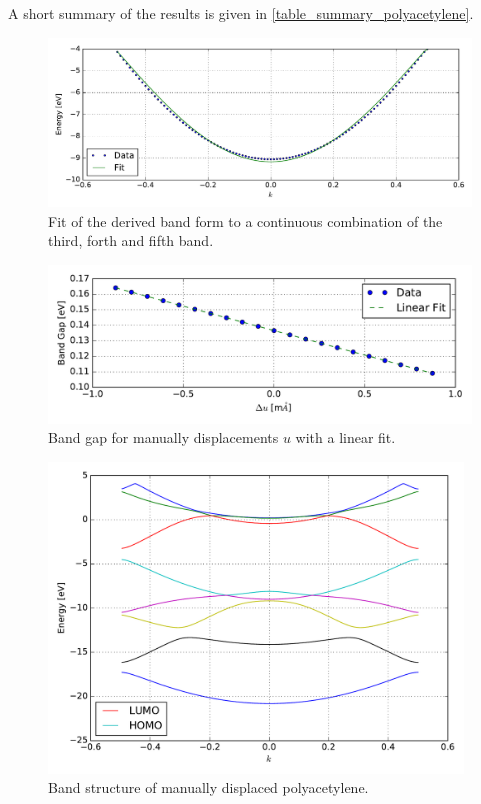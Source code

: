 A short summary of the results is given in \cref{table_summary_polyacetylene}.\\
\begin{figure}
	\centering
	\includegraphics[width = 13cm]{Images/polyacetylene/bands/band_fit}
	\caption{Fit of the derived band form to a continuous combination of the third, forth and fifth band.}
	\label{image_band_fit_t0}
\end{figure}
\begin{figure}
	\centering
	\includegraphics[width = 13cm]{Images/polyacetylene/bands/alpha}
	\caption{Band gap for manually displacements $u$ with a linear fit.}
	\label{image_alpha_fit}
\end{figure}
\begin{figure}
	\centering
	\includegraphics[width = 11cm]{Images/polyacetylene/bands/bandstructure_manually_displaced}
	\caption{Band structure of manually displaced polyacetylene.}
	\label{image_manually_displaced_poly_bandstructure}
\end{figure}
